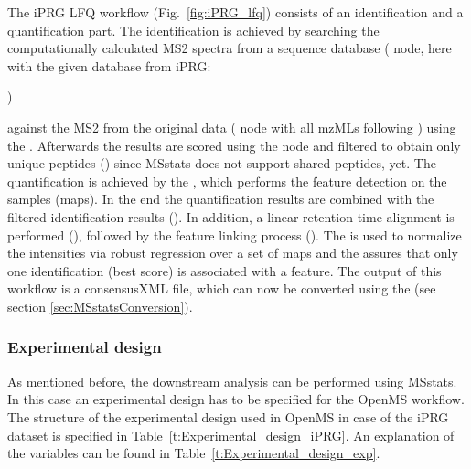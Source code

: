 \noindent The iPRG LFQ workflow (Fig.~\ref{fig:iPRG_lfq}) consists of an identification and a quantification part. The identification is achieved by searching the computationally calculated MS2 spectra from a sequence database ( node, here with the given database from iPRG:
\begin{center}
)
\end{center}
against the MS2 from the original data ( node with all mzMLs following ) using the .
Afterwards the results are scored using the  node and filtered to obtain only unique peptides () since MSstats does not support shared peptides, yet. The quantification is achieved by the , which performs the feature detection on the samples (maps). In the end the quantification results are combined with the filtered identification results (). In addition, a linear retention time alignment is performed (), followed by the feature linking process (). The  is used to normalize the intensities via robust regression over a set of maps and the  assures that only one identification (best score) is associated with a feature. The output of this workflow is a consensusXML file, which can now be converted using the  (see section \ref{sec:MSstatsConversion}). 

\subsubsection{Experimental design}
\label{topic:experimental_design}
\noindent As mentioned before, the downstream analysis can be performed using MSstats. In this case an experimental design has to be specified for the OpenMS workflow. The structure of the experimental design used in OpenMS in case of the iPRG dataset is specified in Table~\ref{t:Experimental_design_iPRG}. An explanation of the variables can be found in Table~\ref{t:Experimental_design_exp}. 

